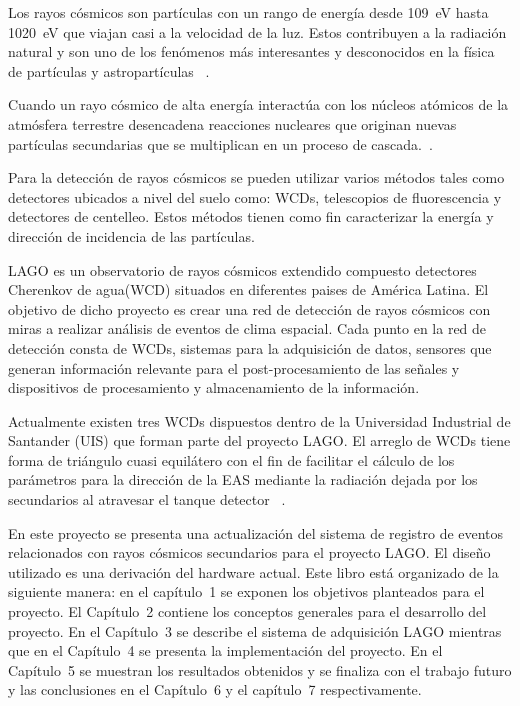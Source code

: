
Los rayos cósmicos son partículas con un rango de energía desde 109~eV hasta 1020~eV que viajan casi a la velocidad de la luz. Estos contribuyen a la radiación natural y son uno de los fenómenos más interesantes y desconocidos en la física de partículas y astropartículas ~\citep{Supanitsky2007}.

Cuando un rayo cósmico de alta energía interactúa con los núcleos atómicos de la  atmósfera terrestre desencadena reacciones nucleares que originan nuevas partículas secundarias que se multiplican en un proceso de cascada.~\citep{phdthesis}.

Para la detección de rayos cósmicos se pueden utilizar varios métodos tales como detectores ubicados a nivel del suelo como: WCDs, telescopios de fluorescencia y detectores de centelleo.
Estos métodos tienen como fin caracterizar la energía y dirección de incidencia de las partículas.

LAGO es un observatorio de rayos cósmicos extendido  compuesto detectores Cherenkov de agua(WCD) situados en diferentes paises de América Latina.
El objetivo de dicho proyecto es crear una red de detección de rayos cósmicos con miras a realizar análisis de eventos de clima espacial.
Cada punto en la red de detección consta de WCDs, sistemas para la adquisición de datos, sensores que generan información relevante para el post-procesamiento de las señales y dispositivos de procesamiento y almacenamiento de la información.

Actualmente existen tres WCDs dispuestos dentro de la Universidad Industrial de Santander (UIS) que forman parte del proyecto LAGO.
El arreglo de WCDs tiene forma de triángulo cuasi equilátero con el fin de facilitar el cálculo de los parámetros para la dirección de la EAS mediante la radiación dejada por los secundarios al atravesar el tanque detector ~\citep{hernandez2018procedimiento}.

En este  proyecto se  presenta  una  actualización del sistema de registro de eventos  relacionados con rayos cósmicos secundarios para el proyecto LAGO.
El diseño utilizado es una derivación del hardware actual.
Este libro está organizado de la siguiente manera: 
en el capítulo~1 se exponen los objetivos planteados para el proyecto.
El Capítulo~2 contiene los conceptos generales para el desarrollo del proyecto.
En el Capítulo~3 se describe el sistema de adquisición LAGO mientras que en el Capítulo~4 se presenta la implementación del proyecto.
En el Capítulo~5 se muestran los resultados obtenidos y se finaliza con el trabajo futuro y las conclusiones en el Capítulo~6 y el capítulo~7 respectivamente.
 
